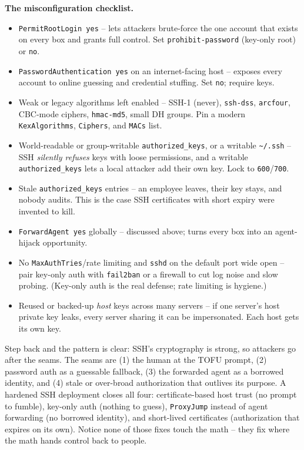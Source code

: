 \begin{attackbox}
\textbf{The misconfiguration checklist.}
\begin{itemize}
  \item \texttt{PermitRootLogin yes} -- lets attackers brute-force the one account that exists on every box and grants full control. Set \texttt{prohibit-password} (key-only root) or \texttt{no}.
  \item \texttt{PasswordAuthentication yes} on an internet-facing host -- exposes every account to online guessing and credential stuffing. Set \texttt{no}; require keys.
  \item Weak or legacy algorithms left enabled -- SSH-1 (never), \texttt{ssh-dss}, \texttt{arcfour}, CBC-mode ciphers, \texttt{hmac-md5}, small DH groups. Pin a modern \texttt{KexAlgorithms}, \texttt{Ciphers}, and \texttt{MACs} list.
  \item World-readable or group-writable \texttt{authorized\_keys}, or a writable \texttt{\textasciitilde/.ssh} -- SSH \emph{silently refuses} keys with loose permissions, and a writable \texttt{authorized\_keys} lets a local attacker add their own key. Lock to \texttt{600}/\texttt{700}.
  \item Stale \texttt{authorized\_keys} entries -- an employee leaves, their key stays, and nobody audits. This is the case SSH certificates with short expiry were invented to kill.
  \item \texttt{ForwardAgent yes} globally -- discussed above; turns every box into an agent-hijack opportunity.
  \item No \texttt{MaxAuthTries}/rate limiting and \texttt{sshd} on the default port wide open -- pair key-only auth with \texttt{fail2ban} or a firewall to cut log noise and slow probing. (Key-only auth is the real defense; rate limiting is hygiene.)
  \item Reused or backed-up \emph{host} keys across many servers -- if one server's host private key leaks, every server sharing it can be impersonated. Each host gets its own key.
\end{itemize}
\end{attackbox}

\begin{intuitionbox}
Step back and the pattern is clear: SSH's cryptography is strong, so attackers go after the seams. The seams are (1) the human at the TOFU prompt, (2) password auth as a guessable fallback, (3) the forwarded agent as a borrowed identity, and (4) stale or over-broad authorization that outlives its purpose. A hardened SSH deployment closes all four: certificate-based host trust (no prompt to fumble), key-only auth (nothing to guess), \texttt{ProxyJump} instead of agent forwarding (no borrowed identity), and short-lived certificates (authorization that expires on its own). Notice none of those fixes touch the math -- they fix where the math hands control back to people.
\end{intuitionbox}

